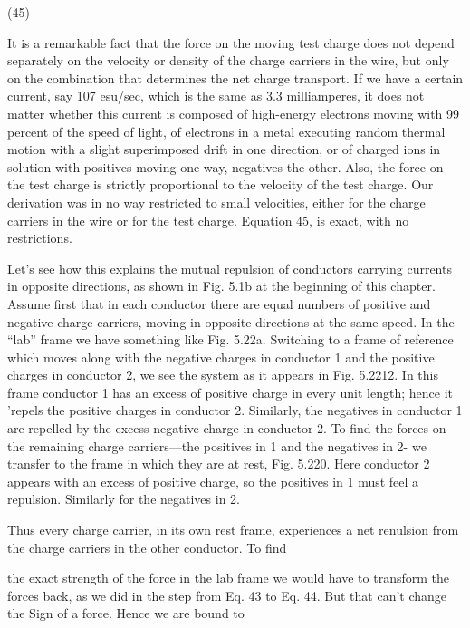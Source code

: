 (45)

It is a remarkable fact that the force on the moving test charge
does not depend separately on the velocity or density of the charge
carriers in the wire, but only on the combination that determines the
net charge transport. If we have a certain current, say 107 esu/sec,
which is the same as 3.3 milliamperes, it does not matter whether this
current is composed of high-energy electrons moving with 99 percent
of the speed of light, of electrons in a metal executing random thermal
motion with a slight superimposed drift in one direction, or of
charged ions in solution with positives moving one way, negatives
the other. Also, the force on the test charge is strictly proportional
to the velocity of the test charge. Our derivation was in no way
restricted to small velocities, either for the charge carriers in the wire
or for the test charge. Equation 45, is exact, with no restrictions.

Let's see how this explains the mutual repulsion of conductors
carrying currents in opposite directions, as shown in Fig. 5.1b at the
beginning of this chapter. Assume first that in each conductor there
are equal numbers of positive and negative charge carriers, moving
in opposite directions at the same speed. In the ``lab'' frame we have
something like Fig. 5.22a. Switching to a frame of reference which
moves along with the negative charges in conductor 1 and the positive
charges in conductor 2, we see the system as it appears in
Fig. 5.2212. In this frame conductor 1 has an excess of positive charge
in every unit length; hence it 'repels the positive charges in conductor
2. Similarly, the negatives in conductor 1 are repelled by the
excess negative charge in conductor 2. To find the forces on the remaining
charge carriers---the positives in 1 and the negatives in 2-
we transfer to the frame in which they are at rest, Fig. 5.220. Here
conductor 2 appears with an excess of positive charge, so the positives
in 1 must feel a repulsion. Similarly for the negatives in 2.

Thus every charge carrier, in its own rest frame, experiences a net
renulsion from the charge carriers in the other conductor. To find

 
 
 

the exact strength of the force in the lab frame we would have to
transform the forces back, as we did in the step from Eq. 43 to Eq. 44.
But that can't change the Sign of a force. Hence we are bound to


